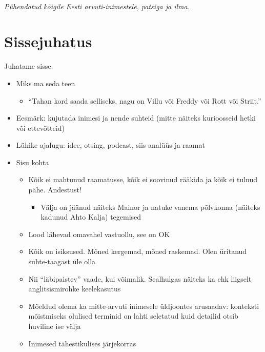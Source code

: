 \documentclass{tufte-book}
\begin{document}
\tableofcontents



\cleardoublepage
~\vfill
\begin{doublespace}
\noindent\fontsize{18}{22}\selectfont\itshape
\nohyphenation
Pühendatud kõigile Eesti arvuti-inimestele, patsiga ja ilma.
\end{doublespace}
\vfill
\vfill


\cleardoublepage
\chapter*{Sissejuhatus}
Juhatame sisse. 
\begin{itemize}
	\item Miks ma seda teen
	\begin{itemize}
		\item \enquote{Tahan kord saada selliseks, nagu on Villu või Freddy või Rott või Striit.}
	\end{itemize}
	\item Eesmärk: kujutada inimesi ja nende suhteid (mitte näiteks kurioosseid hetki või ettevõtteid)
	\item Lühike ajalugu: idee, otsing, podcast, siis analüüs ja raamat
	\item Sisu kohta
	\begin{itemize}
		\item Kõik ei mahtunud raamatusse, kõik ei soovinud rääkida ja kõik ei tulnud pähe. Andestust!
		\begin{itemize}
			\item Välja on jäänud näiteks Mainor ja natuke vanema põlvkonna (näiteks kadunud Ahto Kalja) tegemised
		\end{itemize}
		\item Lood lähevad omavahel vastuollu, see on OK
		\item Kõik on isiksused. Mõned kergemad, mõned raskemad. Olen üritanud suhte-taagast üle olla
		\item Nii \enquote{läbipaistev} vaade, kui võimalik. Sealhulgas näiteks ka ehk liigselt anglitsismirohke keelekasutus
		\item Mõeldud olema ka mitte-arvuti inimesele üldjoontes arusaadav: konteksti mõistmiseks olulised terminid on lahti seletatud kuid detailid otsib huviline ise välja
		\item Inimesed tähestikulises järjekorras

\end{itemize}
\end{itemize}
\end{document}
